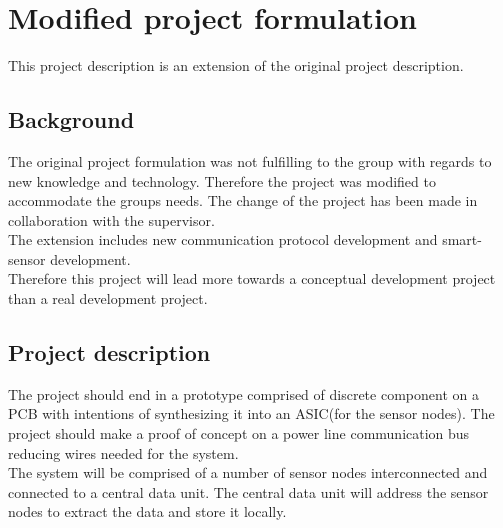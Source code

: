 \section{Modified project formulation}
This project description is an extension of the original project description. 
\subsection{Background}
The original project formulation was not fulfilling to the group with regards to new knowledge and technology. Therefore the project was modified to accommodate the groups needs. The change of the project has been made in collaboration with the supervisor.\\
The extension includes new communication protocol development and smart-sensor development.\\
Therefore this project will lead more towards a conceptual development project than a real development project.\\

\subsection{Project description}
The project should end in a prototype comprised of discrete component on a PCB with intentions of synthesizing it into an ASIC(for the sensor nodes). The project should make a proof of concept on a power line communication bus reducing wires needed for the system.\\
The system will be comprised of a number of sensor nodes interconnected and connected to a central data unit. The central data unit will address the sensor nodes to extract the data and store it locally.
